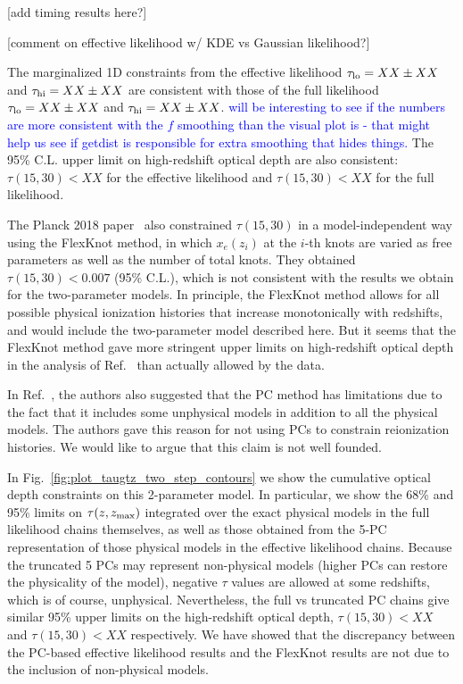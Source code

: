 \documentclass[prd,twocolumn,amsmath,amssymb,floatfix,superscriptaddress,nofootinbib]{revtex4-1}
\newcommand{\zmax}{z_{\rm max}}
\newcommand{\tauhi}{\tau_{\rm hi}}
\newcommand{\taulo}{\tau_{\rm lo}}
\newcommand{\wh}[1]{\textcolor{blue}{#1}}
\begin{document}
[add timing results here?] 

[comment on effective likelihood w/ KDE vs Gaussian likelihood?]

The marginalized 1D constraints from the effective likelihood $\taulo = XX \pm XX$ and $\tauhi = XX \pm XX$ are consistent with those of the full likelihood $\taulo = XX \pm XX$ and $\tauhi = XX \pm XX$. 
\wh{will be interesting to see if the numbers are more consistent with the $f$ smoothing than the visual plot is - that might help us see if getdist is responsible for extra smoothing that hides things.}
The 95\% C.L. upper limit on high-redshift optical depth are also consistent: $\tau(15, 30) < XX$ for the effective likelihood and $\tau(15, 30) < XX$ for the full likelihood.

The Planck 2018 paper~\cite{Aghanim:2018eyx} also constrained $\tau(15, 30)$ in a model-independent way using the FlexKnot method, in which $x_e(z_i)$ at the $i$-th knots are varied as free parameters as well as the number of total knots. They obtained $\tau(15, 30) < 0.007$ (95\% C.L.), which is not consistent with the results we obtain for the two-parameter models. In principle, the FlexKnot method allows for all possible physical ionization histories that increase monotonically with redshifts, and would include the two-parameter model described here. But it seems that the FlexKnot method gave more stringent upper limits on high-redshift optical depth in the analysis of Ref.~\cite{} than actually allowed by the data.

In Ref.~\cite{Aghanim:2018eyx}, the authors also suggested that the PC method has limitations due to the fact that it includes some unphysical models in addition to all the physical models. The authors gave this reason for not using PCs to constrain reionization histories. We would like to argue that this claim is not well founded. 

In Fig.~\ref{fig:plot_taugtz_two_step_contours} we show the cumulative optical depth constraints on this 2-parameter model. In particular, we show the 68\% and 95\% limits on $\tau(z, \zmax)$ integrated over the exact physical models in the full likelihood chains themselves, as well as those obtained from the 5-PC representation of those physical models in the effective likelihood chains. Because the truncated 5 PCs may represent non-physical models (higher PCs can restore the physicality of the model), negative $\tau$ values are allowed at some redshifts, which is of course, unphysical. Nevertheless, the full vs truncated PC chains give similar 95\% upper limits on the high-redshift optical depth, $\tau(15, 30) < XX$ and $\tau(15, 30) < XX$ respectively. We have showed that the discrepancy between the PC-based effective likelihood results and the FlexKnot results are not due to the inclusion of non-physical models.
\end{document}
